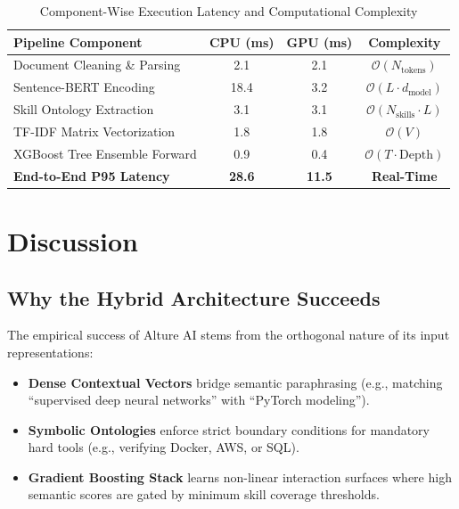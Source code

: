 \documentclass[conference]{IEEEtran}
\begin{document}
\begin{table}[htbp]
\centering
\caption{Component-Wise Execution Latency and Computational Complexity}
\label{tab:latency}
\begin{tabular}{lccc}
\toprule
\textbf{Pipeline Component} & \textbf{CPU (ms)} & \textbf{GPU (ms)} & \textbf{Complexity} \\
\midrule
Document Cleaning \& Parsing        & 2.1  & 2.1  & $\mathcal{O}(N_{\text{tokens}})$ \\
Sentence-BERT Encoding              & 18.4 & 3.2  & $\mathcal{O}(L \cdot d_{\text{model}})$ \\
Skill Ontology Extraction           & 3.1  & 3.1  & $\mathcal{O}(N_{\text{skills}} \cdot L)$ \\
TF-IDF Matrix Vectorization         & 1.8  & 1.8  & $\mathcal{O}(V)$ \\
XGBoost Tree Ensemble Forward       & 0.9  & 0.4  & $\mathcal{O}(T \cdot \text{Depth})$ \\
\midrule
\textbf{End-to-End P95 Latency}     & \textbf{28.6} & \textbf{11.5} & \textbf{Real-Time} \\
\bottomrule
\end{tabular}
\end{table}

\section{Discussion}

\subsection{Why the Hybrid Architecture Succeeds}
The empirical success of Alture AI stems from the orthogonal nature of its input representations:
\begin{itemize}
    \item \textbf{Dense Contextual Vectors} bridge semantic paraphrasing (e.g., matching ``supervised deep neural networks'' with ``PyTorch modeling'').
    \item \textbf{Symbolic Ontologies} enforce strict boundary conditions for mandatory hard tools (e.g., verifying Docker, AWS, or SQL).
    \item \textbf{Gradient Boosting Stack} learns non-linear interaction surfaces where high semantic scores are gated by minimum skill coverage thresholds.
\end{itemize}
\end{document}
